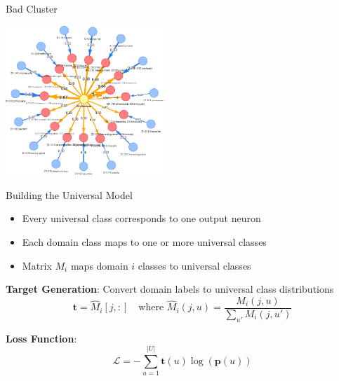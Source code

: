 \documentclass[aspectratio=169]{beamer}
\begin{document}
\begin{frame}{Bad Cluster}
    \begin{center}
        \includegraphics[width=0.45\textwidth]{../thesis/figures/bad_taxonomy.png}
    \end{center}
\end{frame}

\begin{frame}{Building the Universal Model}

    \begin{itemize}
        \item Every universal class corresponds to one output neuron
        \item Each domain class maps to one or more universal classes
        \item Matrix $M_i$ maps domain $i$ classes to universal classes
    \end{itemize}

    \vspace{1em}

    \textbf{Target Generation}: Convert domain labels to universal class distributions
    \begin{equation}
        \mathbf{t} = \hat{M}_i[j, :] \quad \text{where } \hat{M}_i(j, u) = \frac{M_i(j, u)}{\sum_{u'} M_i(j, u')}
    \end{equation}

    \textbf{Loss Function}:
    \begin{equation}
        \mathcal{L} = -\sum_{u=1}^{|U|} \mathbf{t}(u) \log(\mathbf{p}(u))
    \end{equation}
\end{frame}
\end{document}
